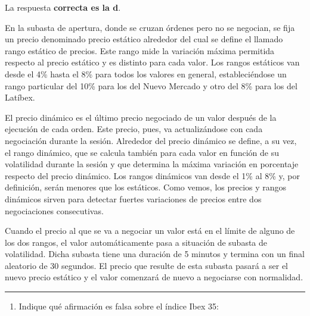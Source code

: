 \documentclass[
  letterpaper,
  DIV=11,
  numbers=noendperiod]{scrreprt}
\providecommand{\tightlist}{%
  \setlength{\itemsep}{0pt}\setlength{\parskip}{0pt}}\usepackage{longtable,booktabs,array}
\begin{document}
\begin{tcolorbox}[enhanced jigsaw, left=2mm, opacityback=0, colback=white, breakable, arc=.35mm, bottomrule=.15mm, rightrule=.15mm, toprule=.15mm, leftrule=.75mm, colframe=quarto-callout-tip-color-frame]
\begin{minipage}[t]{5.5mm}
\textcolor{quarto-callout-tip-color}{\faLightbulb}
\end{minipage}%
\begin{minipage}[t]{\textwidth - 5.5mm}

La respuesta \textbf{correcta es la d}.

En la subasta de apertura, donde se cruzan órdenes pero no se negocian,
se fija un precio denominado precio estático alrededor del cual se
define el llamado rango estático de precios. Este rango mide la
variación máxima permitida respecto al precio estático y es distinto
para cada valor. Los rangos estáticos van desde el 4\% hasta el 8\% para
todos los valores en general, estableciéndose un rango particular del
10\% para los del Nuevo Mercado y otro del 8\% para los del Latíbex.

El precio dinámico es el último precio negociado de un valor después de
la ejecución de cada orden. Este precio, pues, va actualizándose con
cada negociación durante la sesión. Alrededor del precio dinámico se
define, a su vez, el rango dinámico, que se calcula también para cada
valor en función de su volatilidad durante la sesión y que determina la
máxima variación en porcentaje respecto del precio dinámico. Los rangos
dinámicos van desde el 1\% al 8\% y, por definición, serán menores que
los estáticos. Como vemos, los precios y rangos dinámicos sirven para
detectar fuertes variaciones de precios entre dos negociaciones
consecutivas.

Cuando el precio al que se va a negociar un valor está en el límite de
alguno de los dos rangos, el valor automáticamente pasa a situación de
subasta de volatilidad. Dicha subasta tiene una duración de 5 minutos y
termina con un final aleatorio de 30 segundos. El precio que resulte de
esta subasta pasará a ser el nuevo precio estático y el valor comenzará
de nuevo a negociarse con normalidad.

\end{minipage}%
\end{tcolorbox}

\begin{center}\rule{0.5\linewidth}{0.5pt}\end{center}

\begin{enumerate}
\def\labelenumi{\arabic{enumi}.}
\setcounter{enumi}{17}
\tightlist
\item
  Indique qué afirmación es falsa sobre el índice Ibex 35:
\end{enumerate}
\end{document}
